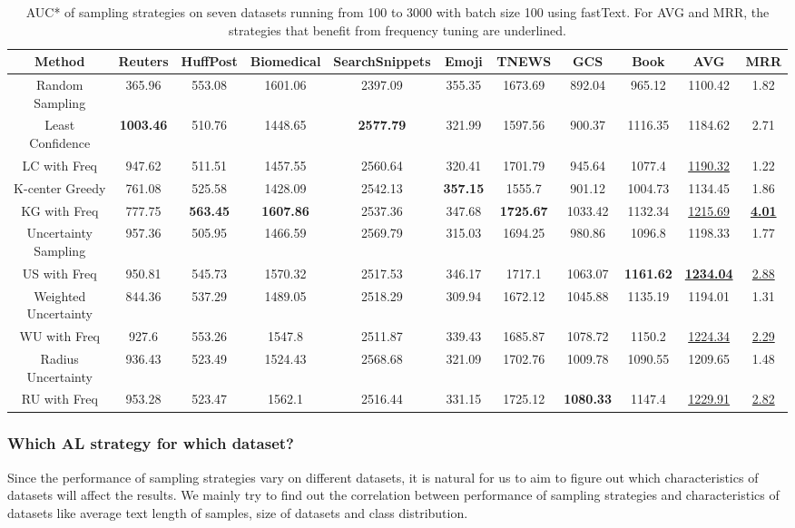 \begin{table}[th]
	\centering
	\small
	\begin{tabular}{ccccccccc|cc}
		\toprule
Method & Reuters & HuffPost & Biomedical & SearchSnippets & Emoji & TNEWS & GCS & Book & AVG & MRR\\ \hline
Random Sampling & 365.96 & 553.08 & 1601.06 & 2397.09 & 355.35 & 1673.69 & 892.04 & 965.12 & 1100.42 & 1.82\\ \hline
Least Confidence & \textbf{1003.46} & 510.76 & 1448.65 & \textbf{2577.79} & 321.99 & 1597.56 & 900.37 & 1116.35 & 1184.62 & 2.71\\
LC with Freq & 947.62 & 511.51 & 1457.55 & 2560.64 & 320.41 & 1701.79 & 945.64 & 1077.4 & \underline{1190.32} & 1.22\\ \hline
K-center Greedy & 761.08 & 525.58 & 1428.09 & 2542.13 & \textbf{357.15} & 1555.7 & 901.12 & 1004.73 & 1134.45 & 1.86\\
KG with Freq & 777.75 & \textbf{563.45} & \textbf{1607.86} & 2537.36 & 347.68 & \textbf{1725.67} & 1033.42 & 1132.34 & \underline{1215.69} & \textbf{\underline{4.01}}\\ \hline        
Uncertainty Sampling & 957.36 & 505.95 & 1466.59 & 2569.79 & 315.03 & 1694.25 & 980.86 & 1096.8 & 1198.33 & 1.77\\
US with Freq & 950.81 & 545.73 & 1570.32 & 2517.53 & 346.17 & 1717.1 & 1063.07 & \textbf{1161.62} & \textbf{\underline{1234.04}} & \underline{2.88}\\ \hline
Weighted Uncertainty & 844.36 & 537.29 & 1489.05 & 2518.29 & 309.94 & 1672.12 & 1045.88 & 1135.19 & 1194.01 & 1.31\\
WU with Freq & 927.6 & 553.26 & 1547.8 & 2511.87 & 339.43 & 1685.87 & 1078.72 & 1150.2 & \underline{1224.34} & \underline{2.29}\\ \hline
Radius Uncertainty & 936.43 & 523.49 & 1524.43 & 2568.68 & 321.09 & 1702.76 & 1009.78 & 1090.55 & 1209.65 & 1.48\\
RU with Freq & 953.28 & 523.47 & 1562.1 & 2516.44 & 331.15 & 1725.12 & \textbf{1080.33} & 1147.4 & \underline{1229.91} & \underline{2.82}\\ \hline
	\end{tabular}
\caption{AUC* of sampling strategies on seven datasets running from 100 to 3000 with batch size 100 using fastText. For AVG and MRR, 
the strategies that benefit from frequency tuning are underlined.}
\label{table:auc_ft}
\end{table}


\subsubsection{Which AL strategy for which dataset?}
Since the performance of sampling strategies vary on different datasets, it is natural for us to aim to figure out which characteristics of datasets will affect the results. We mainly try to find out the correlation between performance of sampling strategies and characteristics of datasets like average text length of samples, size of datasets and class distribution.

